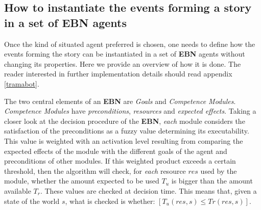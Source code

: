 \documentclass[
		twoside,openright,titlepage,numbers=noenddot,manychapters,
		headinclude,%
                footinclude=false,cleardoublepage=empty,
                BCOR=5mm,
		fontsize=11pt, %
                 enabledeprecatedfontcommands]{scrreprt}
\begin{document}

\subsection{How to instantiate the events forming a story in a set of \textbf{EBN} agents}
\label{instantiate_events}
Once the kind of situated agent preferred is chosen, one needs to define how the events forming the story can be instantiated in a set of \textbf{EBN} agents without changing its properties. Here we provide an overview of how it is done. The reader interested in further implementation details should read appendix \ref{tramabot}.

The two central elements of an \textbf{EBN} are \emph{Goals} and \emph{Competence Modules}.
\emph{Competence Modules} have \emph{preconditions}, \emph{resources} and \emph{expected effects}. Taking a closer look at the decision procedure of the \textbf{EBN}, \emph{each} module considers the satisfaction of the preconditions as a fuzzy value determining its executability. This value is weighted with an activation level resulting from comparing the expected effects of the module with the different goals of the agent and preconditions of other modules. If this weighted product exceeds a certain threshold, then the algorithm will check, for \emph{each} resource $res$ used by the module, whether the amount expected to be used $T_u$ is bigger than the amount available $T_r$. These values are checked at decision time. This means that, given a state of the world $s$, what is checked is whether: $[T_u(res,s) \leq Tr(res,s)]$. 
\end{document}

